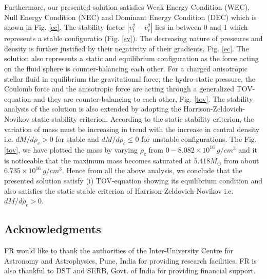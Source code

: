 \documentclass[preprintnumbers,amsmath,amssymb,floatfix,9pt,prd,twocolumn,
superscriptaddress,nofootinbib]{revtex4}
\begin{document}
Furthermore, our presented solution satisfies Weak Energy Condition (WEC), Null Energy Condition (NEC) and Dominant Energy Condition (DEC) which is shown in Fig. \ref{ec}. The stability factor $|v_t^2-v_r^2|$ lies in between 0 and 1 which represents a stable configuratio (Fig. \ref{sv}). The decreasing nature of pressures and density is further justified by their negativity of their gradients, Fig. \ref{ec}. The solution also represents a static and equilibrium configuration as the force acting on the fluid sphere is counter-balancing each other. For a charged anisotropic stellar fluid in equilibrium the gravitational force, the hydro-static pressure, the Coulomb force and the anisotropic force are acting through a generalized TOV-equation and they are counter-balancing to each other, Fig. \ref{tov}. The stability analysis of the solution is also extended by adopting the Harrison-Zeldovich-Novikov static stability criterion. According to the static stability criterion, the variation of mass must be increasing in trend with the increase in central density i.e. $dM/d\rho_c>0$ for stable and $dM/d\rho_c \le 0$ for unstable configurations. The Fig. \ref{tov}, we have plotted the mass by varying $\rho_c$ from $0-8.082 \times 10^{16}~g/cm^3$ and it is noticeable that the maximum mass becomes saturated at $5.418M_\odot$  from about $6.735 \times 10^{16}~g/cm^3$. Hence from all the above analysis, we conclude that the presented solution satisfy (i) TOV-equation showing its equilibrium  condition and also satisfies the static stable criterion of Harrison-Zeldovich-Novikov i.e. $dM/d\rho_c>0$.

\subsection*{Acknowledgments}
 FR would like to thank the authorities of the Inter-University Centre
for Astronomy and Astrophysics, Pune, India for providing research facilities. FR is also
thankful to DST and SERB,  Govt. of India for providing financial support.
 
\end{document}
